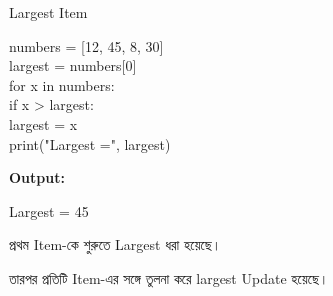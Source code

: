 \begin{codeoutputbox}{Largest Item}

\noindent
\begin{minipage}[t]{0.55\linewidth}
\codeheading

\begin{english}
\ttfamily
numbers = [12, 45, 8, 30]\\
largest = numbers[0]\\[0.5mm]
for x in numbers:\\
\hspace*{4mm}if x > largest:\\
\hspace*{8mm}largest = x\\[0.5mm]
print("Largest =", largest)
\end{english}

\end{minipage}
\hfill
\begin{minipage}[t]{0.41\linewidth}
\outputheading

\textbf{Output:}

\begin{center}
\textenglish{\ttfamily Largest = 45}
\end{center}

প্রথম Item-কে শুরুতে Largest ধরা হয়েছে।

তারপর প্রতিটি Item-এর সঙ্গে তুলনা করে
\textenglish{\ttfamily largest}
Update হয়েছে।

\end{minipage}

\end{codeoutputbox}



